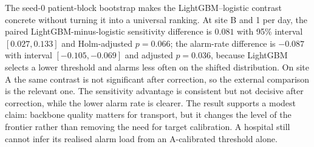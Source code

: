 The seed-0 patient-block bootstrap makes the LightGBM--logistic contrast concrete without turning it into a universal ranking. At site B and 1 per day, the paired LightGBM-minus-logistic sensitivity difference is $0.081$ with 95\% interval $[0.027,0.133]$ and Holm-adjusted $p=0.066$; the alarm-rate difference is $-0.087$ with interval $[-0.105,-0.069]$ and adjusted $p=0.036$, because LightGBM selects a lower threshold and alarms less often on the shifted distribution. On site A the same contrast is not significant after correction, so the external comparison is the relevant one. The sensitivity advantage is consistent but not decisive after correction, while the lower alarm rate is clearer. The result supports a modest claim: backbone quality matters for transport, but it changes the level of the frontier rather than removing the need for target calibration. A hospital still cannot infer its realised alarm load from an A-calibrated threshold alone.

